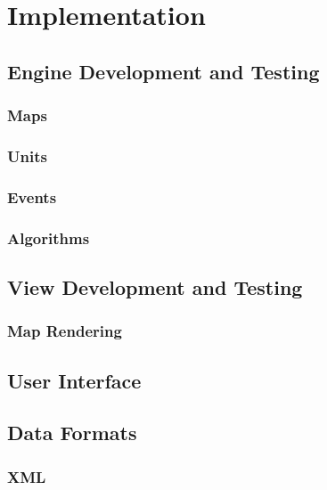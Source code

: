 \section{Implementation}

\subsection{Engine Development and Testing}
\label{sub:engine_development_and_testing}

\subsubsection{Maps}
\label{ssub:maps}

\subsubsection{Units}
\label{ssub:units}

\subsubsection{Events}
\label{ssub:events}

\subsubsection{Algorithms}
\label{ssub:Algorithms}


\subsection{View Development and Testing}

\subsubsection{Map Rendering}
\label{ssub:map_rendering}

\subsection{User Interface}


\subsection{Data Formats}
\subsubsection{XML}

